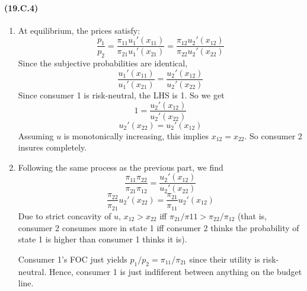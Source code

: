 \documentclass[10pt,letter]{article}
\begin{document}
\paragraph{(19.C.4)}
\begin{enumerate}[label=(\alph*)]
\item At equilibrium, the prices satisfy:
\[ \frac{p_1}{p_2} = \frac{\pi_{11}u_1'(x_{11})}{\pi_{21}u_1'(x_{21})} = \frac{\pi_{12}u_2'(x_{12})}{\pi_{22}u_2'(x_{22})} \]
Since the subjective probabilities are identical,
\[ \frac{u_1'(x_{11})}{u_1'(x_{21})} = \frac{u_2'(x_{12})}{u_2'(x_{22})} \]
Since consumer 1 is risk-neutral, the LHS is 1. So we get
\[ 1 = \frac{u_2'(x_{12})}{u_2'(x_{22})} \]
\[ u_2'(x_{22}) = u_2'(x_{12})  \]
 Assuming $u$ is monotonically increasing, this implies $x_{12} = x_{22}$. So consumer 2 insures completely.
\item Following the same process as the previous part, we find
\[ \frac{\pi_{11}\pi_{22}}{\pi_{21}\pi_{12}} = \frac{u_2'(x_{12})}{u_2'(x_{22})} \]
\[ \frac{\pi_{22}}{\pi_{21}}u_2'(x_{22}) = \frac{\pi_{21}}{\pi_{11}}u_2'(x_{12}) \]
Due to strict concavity of $u$, $x_{12} > x_{22}$ iff $\pi_{21}/\pi{11} > \pi_{22}/\pi_{12}  $ (that is, consumer 2 consumes more in state 1 iff consumer 2 thinks the probability of state 1 is higher than consumer 1 thinks it is).

Consumer 1's FOC just yields $p_1 / p_2 = \pi_{11} / \pi_{21}$ since their utility is risk-neutral. Hence, consumer 1 is just indfiferent between anything on the budget line.
\end{enumerate}
\end{document}
